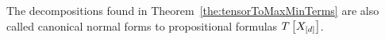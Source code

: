 The decompositions found in Theorem~\ref{the:tensorToMaxMinTerms} are also called canonical normal forms to propositional formulas $T\left[X_{[d]}\right]$.


%




